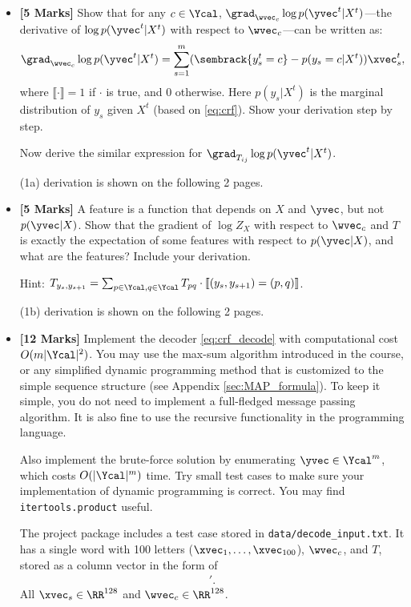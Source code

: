 \documentclass[11pt]{report}
\begin{document}
\begin{itemize}
	\item[(1a)] {\bf [5 Marks]} Show that for any $c \in \Ycal$, 
	$\grad_{\wvec_c} \log p(\yvec^t|X^t)$---the derivative of $\log p(\yvec^t|X^t)$ with respect to $\wvec_c$---can be written as:
	\begin{align}
		\grad_{\wvec_c} \log p(\yvec^t|X^t) & = \sum_{s=1}^m (\sembrack{y^t_s = c} - p(y_s = c | X^t)) \xvec^t_s,
	\end{align}
	where $\llbracket \cdot \rrbracket = 1$ if $\cdot$ is true, and 0 otherwise.
	Here $p(y_s | X^t)$ is the marginal distribution of $y_s$ given $X^t$ (based on \eqref{eq:crf}).
	Show your derivation step by step.

	Now derive the similar expression for $\grad_{T_{ij}} \log p(\yvec^t|X^t)$.

	\textcolor{b}{(1a) derivation is shown on the following 2 pages.}
	
	
	\item[(1b)] {\bf [5 Marks]} A feature is a function that depends on $X$ and $\yvec$, but not $p(\yvec|X)$. Show that the gradient of $\log Z_X$ with respect to $\wvec_c$ and $T$ is exactly the expectation of some features with respect to $p(\yvec | X)$, and what are the features? Include your derivation.
	
	Hint: $T_{y_s, y_{s+1}} = \sum_{p \in \Ycal, q \in \Ycal} T_{pq} \cdot \llbracket (y_s, y_{s+1}) = (p,q)  \rrbracket$.

	\textcolor{b}{(1b) derivation is shown on the following 2 pages.}
	
	
	\item[(1c)] 
	\label{qn:decoding}
	{\bf [12 Marks]} Implement the decoder \eqref{eq:crf_decode} with computational cost $O(m|\Ycal|^2)$.
	You may use the max-sum algorithm introduced in the course, or any simplified dynamic programming method that is customized to the simple sequence structure (see Appendix \ref{sec:MAP_formula}). 
	To keep it simple, you do not need to implement a full-fledged message passing algorithm.
	It is also fine to use the recursive functionality in the programming language.
	
	Also implement the brute-force solution by enumerating $\yvec \in \Ycal^m$, which costs $O(|\Ycal|^m)$ time.  Try small test cases to make sure your implementation of dynamic programming is correct.
	You may find \verb#itertools.product# useful.
	
	The project package includes a test case stored in \verb#data/decode_input.txt#.
	It has a single word with 100 letters ($\xvec_1, \ldots, \xvec_{100}$), $\wvec_c$, and $T$, stored as a column vector in the form of
	\begin{align}
		[\xvec'_1, \ldots, \xvec'_{100}, \wvec'_1, \ldots, \wvec'_{26}, T_{1,1}, T_{1,2}, \ldots, T_{1, 26}, T_{2,1}, \ldots, T_{2, 26}, \ldots, T_{26,1}, \ldots, T_{26, 26}]'.
	\end{align}
	All $\xvec_s \in \RR^{128}$ and $\wvec_c \in \RR^{128}$.
	

\end{itemize}
\end{document}
